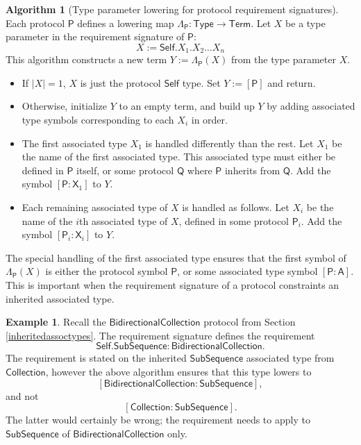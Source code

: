 \documentclass[headsepline,bibliography=totoc]{scrreport}
\newcommand{\namesym}[1]{\mathsf{#1}}
\newcommand{\genericparam}[1]{\bm{\mathsf{#1}}}
\newcommand{\proto}[1]{\bm{\mathsf{#1}}}
\newcommand{\protosym}[1]{[\proto{#1}]}
\newcommand{\assocsym}[2]{[\proto{#1}\colon\namesym{#2}]}
\theoremstyle{definition}
\newtheorem{example}{Example}[chapter]
\theoremstyle{definition}
\theoremstyle{definition}
\newtheorem{algorithm}{Algorithm}[chapter]
\begin{document}
\begin{algorithm}[Type parameter lowering for protocol requirement signatures]\label{lowertypeinproto}
Each protocol $\proto{P}$ defines a lowering map $\Lambda_{\proto{P}}\colon\namesym{Type}\rightarrow\namesym{Term}$. Let $X$ be a type parameter in the requirement signature of $\proto{P}$:
\[X:=\genericparam{Self}.X_1.X_2\ldots X_n\]
This algorithm constructs a new term $Y:=\Lambda_{\proto{P}}(X)$ from the type parameter $X$.
\begin{itemize}
\item
{}
If $|X|=1$, $X$ is just the protocol $\genericparam{Self}$ type. Set $Y:=\protosym{P}$ and return.
\item
{}
Otherwise, initialize $Y$ to an empty term, and build up $Y$ by adding associated type symbols corresponding to each $X_i$ in order.
\item
The first associated type $X_1$ is handled differently than the rest. Let $X_1$ be the name of the first associated type. This associated type must either be defined in $\proto{P}$ itself, or some protocol $\proto{Q}$ where $\proto{P}$ inherits from $\proto{Q}$. Add the symbol $[\proto{P}\colon\namesym{X}_1]$ to $Y$.
\item
Each remaining associated type of $X$ is handled as follows. Let $X_i$ be the name of the $i$th associated type of $X$, defined in some protocol $\proto{P}_i$. Add the symbol $[\proto{P}_i\colon\namesym{X}_i]$ to $Y$.
\end{itemize}
\end{algorithm}
The special handling of the first associated type ensures that the first symbol of $\Lambda_{\proto{P}}(X)$ is either the protocol symbol $\proto{P}$, or some associated type symbol $\assocsym{P}{A}$. This is important when the requirement signature of a protocol constraints an inherited associated type.
\begin{example} 
Recall the $\proto{BidirectionalCollection}$ protocol from Section \ref{inheritedassoctypes}. The requirement signature defines the requirement
\[\genericparam{Self}.\namesym{SubSequence}\colon\proto{BidirectionalCollection}.\]
The requirement is stated on the inherited $\namesym{SubSequence}$ associated type from $\proto{Collection}$, however the above algorithm ensures that this type lowers to
\[\assocsym{BidirectionalCollection}{SubSequence},\]
and not
\[\assocsym{Collection}{SubSequence}.\]
The latter would certainly be wrong; the requirement needs to apply to $\namesym{SubSequence}$ of $\proto{BidirectionalCollection}$ only.
\end{example}
\end{document}
